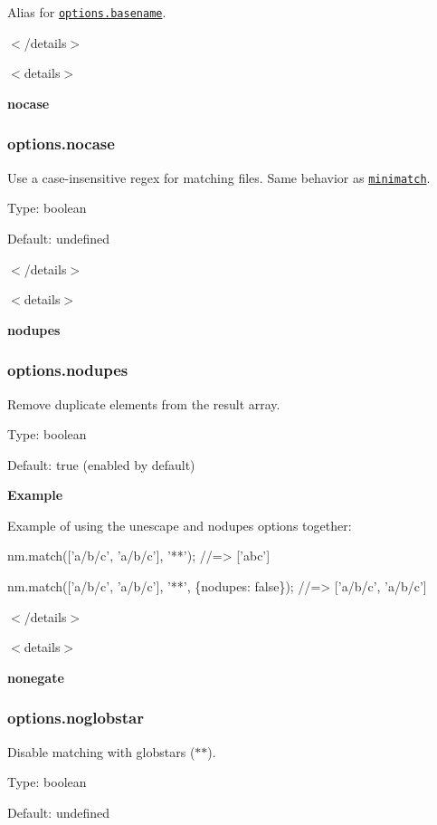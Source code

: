 Alias for \href{#options-basename}{\tt options.\+basename}.

$<$/details$>$

$<$details$>$ 

{\bfseries nocase}

\subsubsection*{options.\+nocase}

Use a case-\/insensitive regex for matching files. Same behavior as \href{https://github.com/isaacs/minimatch}{\tt minimatch}.

Type\+: {\ttfamily boolean}

Default\+: {\ttfamily undefined}

$<$/details$>$

$<$details$>$ 

{\bfseries nodupes}

\subsubsection*{options.\+nodupes}

Remove duplicate elements from the result array.

Type\+: {\ttfamily boolean}

Default\+: {\ttfamily true} (enabled by default)

{\bfseries Example}

Example of using the {\ttfamily unescape} and {\ttfamily nodupes} options together\+:


\begin{DoxyCode}
nm.match(['a/b/c', 'a/b/c'], '**');
//=> ['abc']

nm.match(['a/b/c', 'a/b/c'], '**', \{nodupes: false\});
//=> ['a/b/c', 'a/b/c']
\end{DoxyCode}


$<$/details$>$

$<$details$>$ 

{\bfseries nonegate}

\subsubsection*{options.\+noglobstar}

Disable matching with globstars ({\ttfamily $\ast$$\ast$}).

Type\+: {\ttfamily boolean}

Default\+: {\ttfamily undefined}


